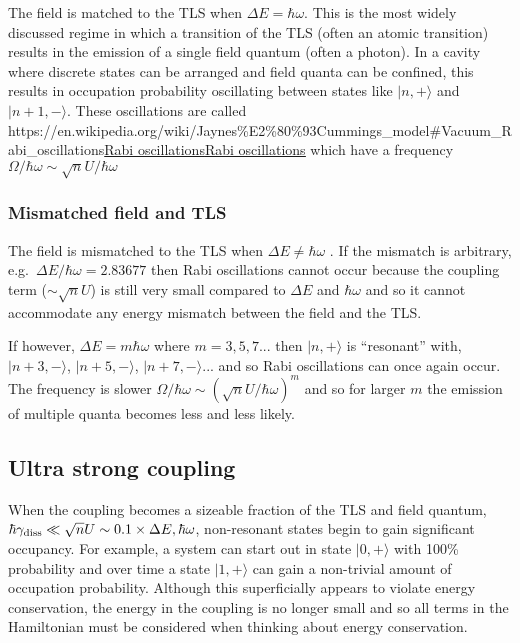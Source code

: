 \documentclass[
]{article}
\let\oldhref\href
\renewcommand{\href}[2]{\ifx#1\urlprefix\oldhref{#1}{#2}\else\uline{\oldhref{#1}{#2}}\fi}
\renewcommand{\[}{\begin{equation}}
\renewcommand{\]}{\end{equation}}
\begin{document}
The field is matched to the TLS when \(\Delta E = \hbar\omega\). This is
the most widely discussed regime in which a transition of the TLS (often
an atomic transition) results in the emission of a single field quantum
(often a photon). In a cavity where discrete states can be arranged and
field quanta can be confined, this results in occupation probability
oscillating between states like \(|n,+\rangle\) and \(|n+1,-\rangle\).
These oscillations are called
\href{https://en.wikipedia.org/wiki/Jaynes\%E2\%80\%93Cummings_model\#Vacuum_Rabi_oscillations}{Rabi
oscillations} which have a frequency
\(\Omega/\hbar\omega \sim \sqrt{n}U/\hbar\omega\)

\subsubsection{Mismatched field and TLS}\label{mismatched-field-and-tls}

The field is mismatched to the TLS when \(\Delta E \neq \hbar\omega\) .
If the mismatch is arbitrary, e.g.~\(\Delta E/ \hbar\omega = 2.83677\)
then Rabi oscillations cannot occur because the coupling term
(\(\sim \sqrt{n}U\)) is still very small compared to \(\Delta E\) and
\(\hbar\omega\) and so it cannot accommodate any energy mismatch between
the field and the TLS.

If however, \(\Delta E = m\hbar \omega\) where \(m=3, 5, 7 ...\) then
\(|n,+\rangle\) is ``resonant'' with, \(|n+3,-\rangle\),
\(|n+5,-\rangle\), \(|n+7,-\rangle ...\) and so Rabi oscillations can
once again occur. The frequency is slower
\(\Omega/\hbar\omega \sim (\sqrt{n}U/\hbar\omega)^m\) and so for larger
\(m\) the emission of multiple quanta becomes less and less likely.

\subsection{Ultra strong coupling}\label{ultra-strong-coupling-1}

When the coupling becomes a sizeable fraction of the TLS and field
quantum,
\(\hbar\gamma_{\rm diss} \ll \sqrt{n}U \sim 0.1 \times \Delta E , \hbar \omega\),
non-resonant states begin to gain significant occupancy. For example, a
system can start out in state \(|0,+\rangle\) with 100\% probability and
over time a state \(|1,+\rangle\) can gain a non-trivial amount of
occupation probability. Although this superficially appears to violate
energy conservation, the energy in the coupling is no longer small and
so all terms in the Hamiltonian must be considered when thinking about
energy conservation.
\end{document}
